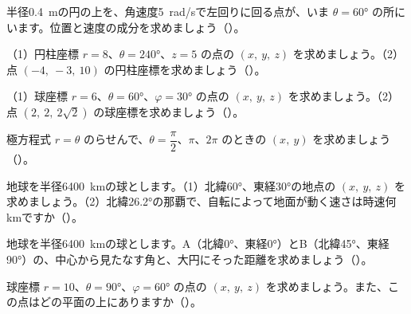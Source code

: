 \bkproblem 半径\qty{0.4}{m}の円の上を、角速度\qty{5}{rad/s}で左回りに回る点が、いま $\theta=60°$ の所にいます。位置と速度の成分を求めましょう（）。

\bkproblem （1）円柱座標 $r=8$、$\theta=240°$、$z=5$ の点の $(x,\ y,\ z)$ を求めましょう。（2）点 $(-4,\ -3,\ 10)$ の円柱座標を求めましょう（）。

\bkproblem （1）球座標 $r=6$、$\theta=60°$、$\varphi=30°$ の点の $(x,\ y,\ z)$ を求めましょう。（2）点 $(2,\ 2,\ 2\sqrt2)$ の球座標を求めましょう（）。

\bkproblem 極方程式 $r=\theta$ のらせんで、$\theta=\dfrac{\pi}{2}$、$\pi$、$2\pi$ のときの $(x,\ y)$ を求めましょう（）。


\bkproblem 地球を半径\qty{6400}{km}の球とします。（1）北緯60°、東経30°の地点の $(x,\ y,\ z)$ を求めましょう。（2）北緯26.2°の那覇で、自転によって地面が動く速さは時速何kmですか（）。

\bkproblem 地球を半径\qty{6400}{km}の球とします。A（北緯0°、東経0°）とB（北緯45°、東経90°）の、中心から見たなす角と、大円にそった距離を求めましょう（）。

\bkproblem 球座標 $r=10$、$\theta=90°$、$\varphi=60°$ の点の $(x,\ y,\ z)$ を求めましょう。また、この点はどの平面の上にありますか（）。

